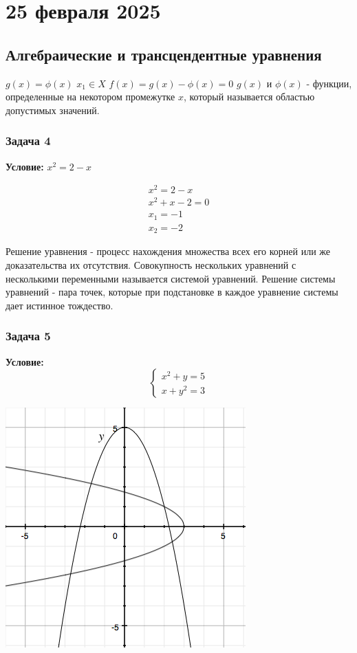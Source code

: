\documentclass[]{article}
\begin{document}
\section{25 февраля 2025}

\subsection{Алгебраические и трансцендентные уравнения}
$g(x) = \phi(x)$
\newline
$x_1 \in X$
\newline
$f(x) = g(x)-\phi(x)=0$
\newline
$g(x)$ и $\phi(x)$ - функции, определенные на некотором промежутке $x$, который называется областью допустимых значений.
\newline
\subsubsection{Задача 4}

\textbf{Условие: } $x^2=2-x$

\begin{gather*}
x^2=2-x\\
x^2+x-2=0\\
x_1 = -1\\
x_2 = -2
\end{gather*}

Решение уравнения - процесс нахождения множества всех его корней или же доказательства их отсутствия. Совокупность нескольких уравнений с несколькими переменными называется системой уравнений. Решение системы уравнений - пара точек, которые при подстановке в каждое уравнение системы дает истинное тождество.
\subsubsection{Задача 5}

\textbf{Условие: }\[
\begin{cases}
x^2+y=5\\
x+y^2=3
\end{cases}
\]

\begingroup
\centering
\includegraphics[scale=0.5]{graph4}
\endgroup
\end{document}
